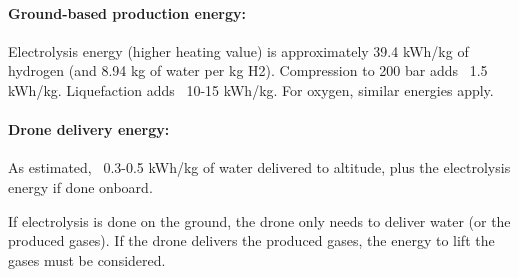 \paragraph{Ground-based production energy:}
Electrolysis energy (higher heating value) is approximately 39.4 kWh/kg of hydrogen (and 8.94 kg of water per kg H2). Compression to 200 bar adds ~1.5 kWh/kg. Liquefaction adds ~10-15 kWh/kg. For oxygen, similar energies apply.

\paragraph{Drone delivery energy:}
As estimated, ~0.3-0.5 kWh/kg of water delivered to altitude, plus the electrolysis energy if done onboard.

If electrolysis is done on the ground, the drone only needs to deliver water (or the produced gases). If the drone delivers the produced gases, the energy to lift the gases must be considered.

